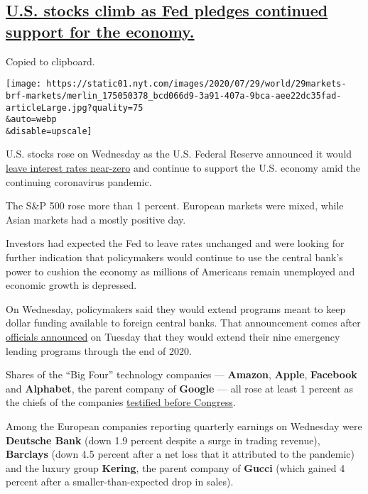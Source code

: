 \hypertarget{us-stocks-climb-as-fed-pledges-continued-support-for-the-economy}{%
\subsection{\texorpdfstring{\protect\hyperlink{us-stocks-climb-as-fed-pledges-continued-support-for-the-economy}{U.S.
stocks climb as Fed pledges continued support for the
economy.}}{U.S. stocks climb as Fed pledges continued support for the economy.}}\label{us-stocks-climb-as-fed-pledges-continued-support-for-the-economy}}

Copied to clipboard.

\texttt{[image: https://static01.nyt.com/images/2020/07/29/world/29markets-brf-markets/merlin\_175050378\_bcd066d9-3a91-407a-9bca-aee22dc35fad-articleLarge.jpg?quality=75\\\&auto=webp\\\&disable=upscale]}

U.S. stocks rose on Wednesday as the U.S. Federal Reserve announced it
would
\href{https://www.nytimes.com/live/2020/07/29/business/stock-market-today-coronavirus/federal-reserve-leaves-rates-near-zero-and-pledges-ongoing-economic-support}{leave
interest rates near-zero} and continue to support the U.S. economy amid
the continuing coronavirus pandemic.

The S\&P 500 rose more than 1 percent. European markets were mixed,
while Asian markets had a mostly positive day.

Investors had expected the Fed to leave rates unchanged and were looking
for further indication that policymakers would continue to use the
central bank's power to cushion the economy as millions of Americans
remain unemployed and economic growth is depressed.

On Wednesday, policymakers said they would extend programs meant to keep
dollar funding available to foreign central banks. That announcement
comes after
\href{https://www.nytimes.com/2020/07/28/business/economy/coronavirus-federal-reserve-policy.html}{officials
announced} on Tuesday that they would extend their nine emergency
lending programs through the end of 2020.

Shares of the ``Big Four'' technology companies --- \textbf{Amazon},
\textbf{Apple}, \textbf{Facebook} and \textbf{Alphabet}, the parent
company of \textbf{Google} --- all rose at least 1 percent as the chiefs
of the companies
\href{https://www.nytimes.com/live/2020/07/29/technology/tech-ceos-hearing-testimony}{testified
before Congress}.

Among the European companies reporting quarterly earnings on Wednesday
were \textbf{Deutsche Bank} (down 1.9 percent despite a surge in trading
revenue), \textbf{Barclays} (down 4.5 percent after a net loss that it
attributed to the pandemic) and the luxury group \textbf{Kering}, the
parent company of \textbf{Gucci} (which gained 4 percent after a
smaller-than-expected drop in sales).

